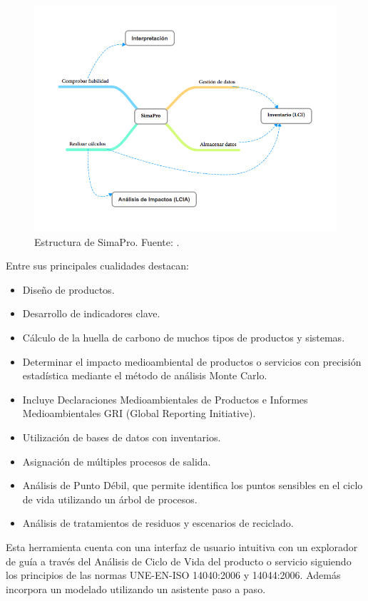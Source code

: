 \begin{figure}[!htb]
\centering
\includegraphics[width=13cm]{img/simapro.png}
\caption[Estructura de SimaPro]{Estructura de SimaPro. Fuente: \protect\cite{mgoedkoop2}.}
\label{fig:simapro}
\end{figure}

Entre sus principales cualidades destacan:

\begin{itemize}
  \item Diseño de productos.
  \item Desarrollo de indicadores clave.
  \item Cálculo de la huella de carbono de muchos tipos de productos y sistemas.
  \item Determinar el impacto medioambiental de productos o servicios con precisión estadística mediante el método de análisis Monte Carlo.
  \item Incluye Declaraciones Medioambientales de Productos e Informes Medioambientales GRI (Global Reporting Initiative).
  \item Utilización de bases de datos con inventarios.
  \item Asignación de múltiples procesos de salida.
  \item Análisis de Punto Débil, que permite identifica los puntos sensibles en el ciclo de vida utilizando un árbol de procesos.
  \item Análisis de tratamientos de residuos y escenarios de reciclado.
\end{itemize}

Esta herramienta cuenta con una interfaz de usuario intuitiva con un explorador de guía a través del Análisis de Ciclo de Vida del producto o servicio siguiendo los principios de las normas UNE-EN-ISO 14040:2006 y 14044:2006. Además incorpora un modelado utilizando un asistente paso a paso.

